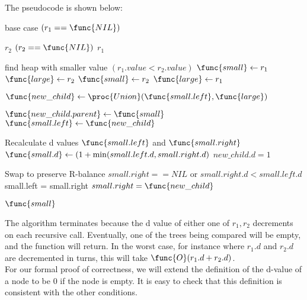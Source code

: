 \documentclass[11pt, answers]{exam}
\theoremstyle{plain}
\theoremstyle{definition}
\begin{document}
\begin{questions}
\begin{parts}
\begin{solution}
\begin{enumerate}
\end{enumerate}

The pseudocode is shown below:

\begin{codebox}

\li \Comment  base case
\li \If $(r_1 == \func{NIL})$ \Then		

\li 	\Return $r_2$
\li \ElseIf $(r_2 == \func{NIL})$ \Then
\li 	\Return $r_1$
\li \Else

\li \Comment  find heap with smaller value
\li	\If $(r_1.value	< r_2.value)$ \Then
\li		$\func{small} \gets r_1 $
\li		$\func{large} \gets r_2$
\li	\Else
\li		$\func{small} \gets r_2 $
\li		$\func{large} \gets r_1$
		\End
		
		
\li	$\func{new\_child} \gets \proc{Union}(\func{small.left}, \func{large})$


\li $\func{new\_child.parent} \gets \func{small}$
\li $\func{small.left} \gets \func{new\_child}$

\li \Comment Recalculate d values
\li \If $\func{small.left}$ and $\func{small.right}$ \Then
\li $\func{small.d} \gets (1+\min(small.left.d, small.right.d)$
\li \Else 
\li     ${new\_child.d = 1}$
        \End

\li \Comment Swap to preserve R-balance
\li \If $small.right == NIL$ or $small.right.d < small.left.d$   \Then
\li     small.left = small.right
\li     $small.right = \func{new\_child}$
        \End

\li 	\Return $\func{small}$
	\End
\end{codebox}

The algorithm terminates because the d value of either one of $r_1, r_2$ decrements on each recursive call. Eventually, one of the trees being compared will be empty, and the function will return. In the worst case, for instance where $r_1.d$ and $r_2.d$ are decremented in turns, this will take $\func{O}(r_1 .d + r_2 .d)$.\\

For our formal proof of correctness, we will extend the definition of the d-value of a node to be 0 if the node is empty. It is easy to check that this definition is consistent with the other conditions.\\


\end{solution}
\end{parts}
\end{questions}
\end{document}
